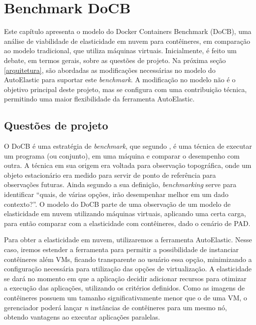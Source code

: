 \documentclass[twoside,english,brazilian]{UNISINOSartigo}
\begin{document}
\section{Benchmark DoCB}
\label{model}

Este capítulo apresenta o modelo do Docker Containers Benchmark (DoCB), uma análise de viabilidade de elasticidade em nuvem para contêineres, em comparação ao modelo tradicional, que utiliza máquinas virtuais. Inicialmente, é feito um debate, em termos gerais, sobre as questões de projeto. Na próxima seção \ref{arquitetura}, são abordadas as modificações necessárias no modelo do AutoElastic para suportar este \textit{benchmark}. A modificação no modelo não é o objetivo principal deste projeto, mas se configura com uma contribuição técnica, permitindo uma maior flexibilidade da ferramenta AutoElastic. 

\subsection{Questões de projeto}
\label{questao}

O DoCB é uma estratégia de \textit{benchmark}, que segundo , é uma técnica de executar um programa (ou conjunto), em uma máquina e comparar o desempenho com outra. A técnica em sua origem era voltada para observação topográfica, onde um objeto estacionário era medido para servir de ponto de referência para observações futuras. Ainda segundo a sua definição, \textit{benchmarking} serve para identificar ``quais, de várias opções, irão desempenhar melhor em um dado contexto?''. O modelo do DoCB parte de uma observação de um modelo de elasticidade em nuvem utilizando máquinas virtuais, aplicando uma certa carga, para então comparar com a elasticidade com contêineres, dado o cenário de PAD.

Para obter a elasticidade em nuvem, utilizaremos a ferramenta AutoElastic. Nesse caso, iremos estender a ferramenta para permitir a possibilidade de instanciar contêineres além VMs, ficando transparente ao usuário essa opção, minimizando a configuração necessária para utilização das opções de virtualização. A elasticidade se dará no momento em que a aplicação decidir adicionar recursos para otimizar a execução das aplicações, utilizando os critérios definidos. Como as imagens de contêineres possuem um tamanho significativamente menor que o de uma VM, o gerenciador poderá lançar \textit{n} instâncias de contêineres para um mesmo nó, obtendo vantagens ao executar aplicações paralelas. 
\end{document}
